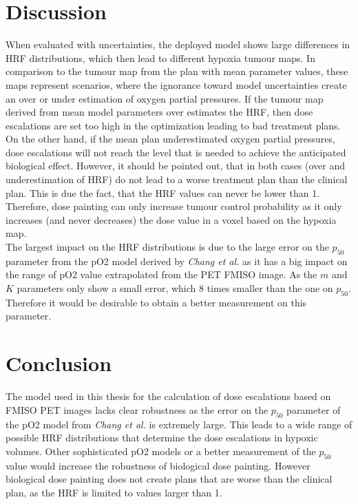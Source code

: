 \section{Discussion}
When evaluated with uncertainties, the deployed model shows large differences in HRF distributions, which then lead to different hypoxia tumour maps. In comparison to the tumour map from the plan with mean parameter values, these maps represent scenarios, where the ignorance toward model uncertainties create an over or under estimation of oxygen partial pressures. If the tumour map derived from mean model parameters over estimates the HRF, then dose escalations are set too high in the optimization leading to bad treatment plans. On the other hand, if the mean plan underestimated oxygen partial pressures, dose escalations will not reach the level that is needed to achieve the anticipated biological effect. However, it should be pointed out, that in both cases (over and underestimation of HRF) do not lead to a worse treatment plan than the clinical plan. This is due the fact, that the HRF values can never be lower than 1. Therefore, dose painting can only increase tumour control probability as it only increases (and never decreases) the dose value in a voxel based on the hypoxia map.\\The largest impact on the HRF distributions is due to the large error on the $p_{50}$ parameter from the pO2 model derived by \textit{Chang et al.} as it has a big impact on the range of pO2 value extrapolated from the PET FMISO image. As the $m$ and $K$ parameters only show a small error, which 8 times smaller than the one on $p_{50}$. Therefore it would be desirable to obtain a better measurement on this parameter. 
\section{Conclusion}
The model used in this thesis for the calculation of dose escalations based on FMISO PET images lacks clear robustness as the error on the $p_{50}$ parameter of the pO2 model from \textit{Chang et al.}\cite{pmid19994538} is extremely large. This leads to a wide range of possible HRF distributions that determine the dose escalations in hypoxic volumes. Other sophisticated pO2 models or a better measurement of the $p_{50}$ value would increase the robustness of biological dose painting. However biological dose painting does not create plans that are worse than the clinical plan, as the HRF is limited to values larger than 1.
